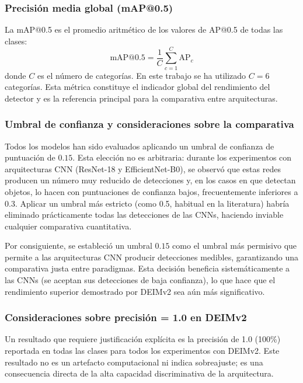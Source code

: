 \subsubsection{Precisión media global (mAP@0.5)}

La \acrfull{mAP}@0.5 es el promedio aritmético de los valores de AP@0.5 de todas las clases:
\begin{equation}
\text{mAP@0.5} = \frac{1}{C} \sum_{c=1}^{C} \text{AP}_c
\label{eq:map}
\end{equation}
donde $C$ es el número de categorías. En este trabajo se ha utilizado $C = 6$ categorías. Esta métrica constituye el indicador global del rendimiento del detector y es la referencia principal para la comparativa entre arquitecturas.

\subsubsection{Umbral de confianza y consideraciones sobre la comparativa}

Todos los modelos han sido evaluados aplicando un umbral de confianza de puntuación de $0.15$. Esta elección no es arbitraria: durante los experimentos con arquitecturas CNN (ResNet-18 y EfficientNet-B0), se observó que estas redes producen un número muy reducido de detecciones y, en los casos en que detectan objetos, lo hacen con puntuaciones de confianza bajos, frecuentemente inferiores a 0.3. Aplicar un umbral más estricto (como 0.5, habitual en la literatura) habría eliminado prácticamente todas las detecciones de las CNNs, haciendo inviable cualquier comparativa cuantitativa.

Por consiguiente, se estableció un umbral $0.15$ como el umbral más permisivo que permite a las arquitecturas CNN producir detecciones medibles, garantizando una comparativa justa entre paradigmas. Esta decisión beneficia sistemáticamente a las CNNs (se aceptan sus detecciones de baja confianza), lo que hace que el rendimiento superior demostrado por DEIMv2 sea aún más significativo.

\subsubsection{Consideraciones sobre precisión = 1.0 en DEIMv2}

Un resultado que requiere justificación explícita es la precisión de 1.0 (100\%) reportada en todas las clases para todos los experimentos con DEIMv2. Este resultado no es un artefacto computacional ni indica sobreajuste; es una consecuencia directa de la alta capacidad discriminativa de la arquitectura.

